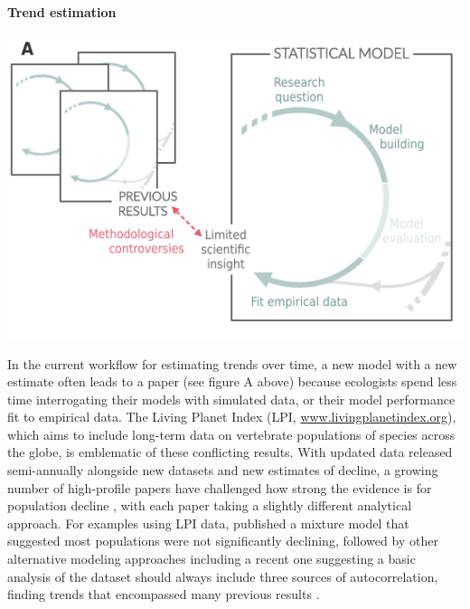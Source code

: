 \documentclass[11pt]{article}
\begin{document}
\begin{tcolorbox}[
sharp corners=all,
colback=white,
colframe=black,
size=tight,
boxrule=0.1mm,
grow to left by=+1cm, grow to right by=+1cm,
enlarge top by=-1.2cm,
left=3mm,right=3mm, top = 2mm, bottom = 2mm,
fontupper=\footnotesize
]
{\begin{multicols}{2}

\centerline{\bf Trend estimation}
\vspace*{2mm}
\begin{minipage}[t]{\linewidth}
    \includegraphics[width=\linewidth]{../figures/trendestimation_details}

    \vspace*{1mm}
\end{minipage}

In the current workflow for estimating trends over time, a new model with a new estimate often leads to a paper (see figure A above) because ecologists spend less time interrogating their models with simulated data, or their model performance fit to empirical data. 
The Living Planet Index (LPI, \url{www.livingplanetindex.org}), which aims to include long-term data on vertebrate populations of species across the globe, is emblematic of these conflicting results. %
With updated data released semi-annually alongside new datasets and new estimates of decline, a growing number of high-profile papers have challenged how strong the evidence is for population decline \citep{Dornelas2014,gonzalez2016estimating,wagner2021insect,muller2024weather}, with each paper taking a slightly different analytical approach. For examples using LPI data, \citet{Leung2020} published a mixture model that suggested most populations were not significantly declining, followed by other alternative modeling approaches \citep{Buschke2021,puurtinen2022living} including a recent one suggesting a basic analysis of the dataset should always include three sources of autocorrelation, finding trends that encompassed many previous results \citep{Johnson2024}. 



\end{multicols}}
\end{tcolorbox}
\end{document}
